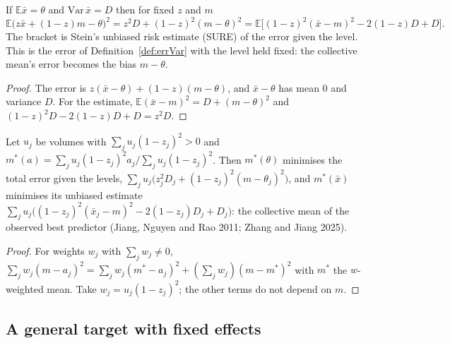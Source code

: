 \begin{theorem}\label{thm:Core_blend_given_level}
  \leanok
  If $\mathbb E\bar x = \theta$ and $\mathrm{Var}\,\bar x = D$ then for fixed $z$ and $m$
  \[
    \mathbb E\bigl(z\bar x + (1-z)m - \theta\bigr)^2 = z^2D + (1-z)^2(m-\theta)^2
    = \mathbb E\bigl[(1-z)^2(\bar x - m)^2 - 2(1-z)D + D\bigr].
  \]
  The bracket is Stein's unbiased risk estimate (SURE) of the error given the level.
  This is the error  of Definition~\ref{def:errVar} with the level held fixed: the
  collective mean's error becomes the bias $m - \theta$.
\end{theorem}
\begin{proof}
  \leanok
  The error is $z(\bar x - \theta) + (1-z)(m-\theta)$, and $\bar x - \theta$ has mean $0$ and
  variance $D$. For the estimate, $\mathbb E(\bar x - m)^2 = D + (m-\theta)^2$ and
  $(1-z)^2D - 2(1-z)D + D = z^2D$.
\end{proof}

\begin{theorem}\label{thm:Core_obpMean}
  \leanok
  Let $u_j$ be volumes with $\sum_j u_j(1-z_j)^2 > 0$ and
  $m^*(a) = \sum_j u_j(1-z_j)^2a_j / \sum_j u_j(1-z_j)^2$. Then $m^*(\theta)$ minimises the
  total error given the levels, $\sum_j u_j\bigl(z_j^2D_j + (1-z_j)^2(m-\theta_j)^2\bigr)$, and
  $m^*(\bar x)$ minimises its unbiased estimate
  $\sum_j u_j\bigl((1-z_j)^2(\bar x_j - m)^2 - 2(1-z_j)D_j + D_j\bigr)$: the collective mean of
  the observed best predictor (Jiang, Nguyen and Rao 2011; Zhang and Jiang 2025).
\end{theorem}
\begin{proof}
  \leanok
  For weights $w_j$ with $\sum_j w_j \ne 0$,
  $\sum_j w_j(m - a_j)^2 = \sum_j w_j(m^* - a_j)^2 + (\sum_j w_j)(m - m^*)^2$ with $m^*$ the
  $w$-weighted mean. Take $w_j = u_j(1-z_j)^2$; the other terms do not depend on $m$.
\end{proof}

\subsection*{A general target with fixed effects}

